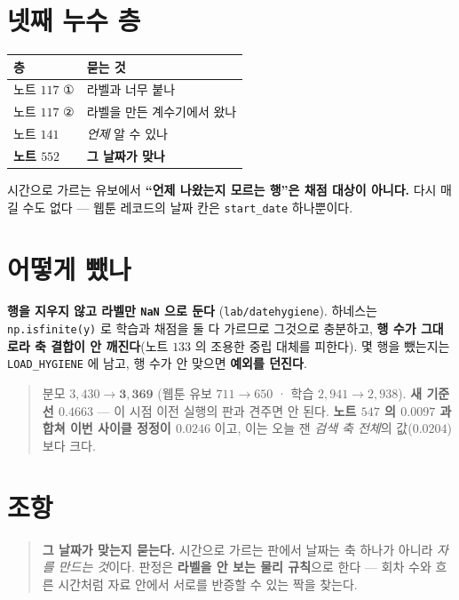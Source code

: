 \documentclass[11pt]{article}
\begin{document}
\section{넷째 누수 층}

\begin{center}
\begin{tabular}{ll}
\hline
층 & 묻는 것 \\
\hline
노트 $117$ ① & 라벨과 너무 붙나 \\
노트 $117$ ② & 라벨을 만든 계수기에서 왔나 \\
노트 $141$ & \emph{언제} 알 수 있나 \\
\textbf{노트 $552$} & \textbf{그 날짜가 맞나} \\
\hline
\end{tabular}
\end{center}

시간으로 가르는 유보에서 \textbf{``언제 나왔는지 모르는 행''은 채점 대상이
아니다.} 다시 매길 수도 없다 --- 웹툰 레코드의 날짜 칸은
\texttt{start\_date} 하나뿐이다.

\section*{어떻게 뺐나}

\textbf{행을 지우지 않고 라벨만 \texttt{NaN} 으로 둔다}
(\texttt{lab/datehygiene}). 하네스는 \texttt{np.isfinite(y)} 로 학습과 채점을
둘 다 가르므로 그것으로 충분하고, \textbf{행 수가 그대로라 축 결합이 안
깨진다}(노트 $133$ 의 조용한 중립 대체를 피한다). 몇 행을 뺐는지는
\texttt{LOAD\_HYGIENE} 에 남고, 행 수가 안 맞으면 \textbf{예외를 던진다}.

\begin{quote}
분모 $3{,}430 \to \mathbf{3{,}369}$ (웹툰 유보 $711 \to 650$ · 학습
$2{,}941 \to 2{,}938$). \textbf{새 기준선 $0.4663$} --- 이 시점 이전 실행의
판과 견주면 안 된다. \textbf{노트 $547$ 의 $0.0097$ 과 합쳐 이번 사이클
정정이 $0.0246$} 이고, 이는 오늘 잰 \emph{검색 축 전체}의 값($0.0204$)보다
크다.
\end{quote}

\section*{조항}

\begin{quote}
\textbf{그 날짜가 맞는지 묻는다.} 시간으로 가르는 판에서 날짜는 축 하나가
아니라 \emph{자를 만드는 것}이다. 판정은 \textbf{라벨을 안 보는 물리
규칙}으로 한다 --- 회차 수와 흐른 시간처럼 자료 안에서 서로를 반증할 수
있는 짝을 찾는다.
\end{quote}
\end{document}
